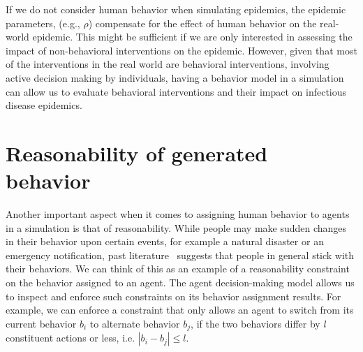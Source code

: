 \documentclass[doublespace]{VTthesis}
\begin{document}
    If we do not consider human behavior when simulating epidemics, the epidemic parameters, (e.g., $\rho$) compensate for the effect of human behavior on the real-world epidemic. This might be sufficient if we are only interested in assessing the impact of non-behavioral interventions on the epidemic. However, given that most of the interventions in the real world are behavioral interventions, involving active decision making by individuals, having a behavior model in a simulation can allow us to evaluate behavioral interventions and their impact on infectious disease epidemics. 
    
    \section{Reasonability of generated behavior}
    Another important aspect when it comes to assigning human behavior to agents in a simulation is that of reasonability. While people may make sudden changes in their behavior upon certain events, for example a natural disaster or an emergency notification, past literature~\cite{ariely2008predictably} suggests that people in general stick with their behaviors. We can think of this as an example of a reasonability constraint on the behavior assigned to an agent. The agent decision-making model allows us to inspect and enforce such constraints on its behavior assignment results. For example, we can enforce a constraint that only allows an agent to switch from its current behavior $b_i$ to alternate behavior $b_j$, if the two behaviors differ by $l$ constituent actions or less, i.e. $|b_i - b_j| \le l$. 
    
\end{document}

